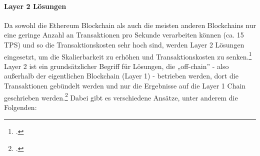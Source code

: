 \paragraph{Layer 2 Lösungen}
\label{sec:definition-layer-2-solutions}

Da sowohl die Ethereum Blockchain als auch die meisten anderen Blockchains nur eine geringe Anzahl an Transaktionen pro Sekunde verarbeiten können (ca. 15 TPS) und so die Transaktionskosten sehr hoch sind, werden Layer 2 Lösungen eingesetzt, um die Skalierbarkeit zu erhöhen und Transaktionskosten zu senken.\footcite[Vgl.][]{w17}
Layer 2 ist ein grundsätzlicher Begriff für Lösungen, die „off-chain” - also außerhalb der eigentlichen Blockchain (Layer 1) - betrieben werden, dort die Transaktionen gebündelt werden und nur die Ergebnisse auf die Layer 1 Chain geschrieben werden.\footcite[Vgl.][]{w18}
Dabei gibt es verschiedene Ansätze, unter anderem die Folgenden:
